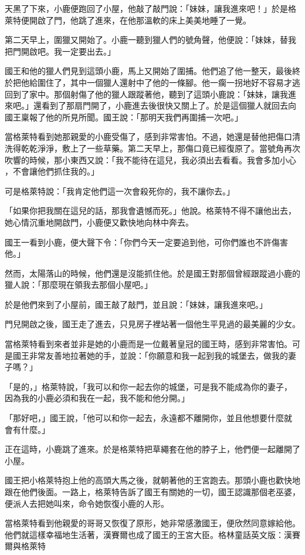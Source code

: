 \documentclass[oneside,10pt]{memoir} %
\begin{document}
天黑了下來，小鹿便跑回了小屋，他敲了敲門說：「妹妹，讓我進來吧！」於是格
萊特便開啟了門，他跳了進來，在他那溫軟的床上美美地睡了一覺。

第二天早上，圍獵又開始了。小鹿一聽到獵人們的號角聲，他便說：「妹妹，替我
把門開啟吧。我一定要出去。」

國王和他的獵人們見到這頭小鹿，馬上又開始了圍捕。他們追了他一整天，最後終
於把他給圍住了，其中一個獵人還射中了他的一條腳。他一瘸一拐地好不容易才逃
回到了家中。那個射傷了他的獵人跟蹤著他，聽到了這頭小鹿說：「妹妹，讓我進
來吧。」還看到了那扇門開了，小鹿進去後很快又關上了。於是這個獵人就回去向
國王稟報了他的所見所聞。國王說：「那明天我們再圍捕一次吧。」

當格萊特看到她那親愛的小鹿受傷了，感到非常害怕。不過，她還是替他把傷口清
洗得乾乾淨淨，敷上了一些草藥。第二天早上，那傷口竟已經復原了。當號角再次
吹響的時候，那小東西又說：「我不能待在這兒，我必須出去看看。我會多加小心
，不會讓他們抓住我的。」

可是格萊特說：「我肯定他們這一次會殺死你的，我不讓你去。」

「如果你把我關在這兒的話，那我會遺憾而死。」他說。格萊特不得不讓他出去，
她心情沉重地開啟門，小鹿便又歡快地向林中奔去。

國王一看到小鹿，便大聲下令：「你們今天一定要追到他，可你們誰也不許傷害他。」

然而，太陽落山的時候，他們還是沒能抓住他。於是國王對那個曾經跟蹤過小鹿的
獵人說：「那麼現在領我去那個小屋吧。」

於是他們來到了小屋前，國王敲了敲門，並且說：「妹妹，讓我進來吧。」

門兒開啟之後，國王走了進去，只見房子裡站著一個他生平見過的最美麗的少女。

當格萊特看到來者並非是她的小鹿而是一位戴著皇冠的國王時，感到非常害怕。可
是國王非常友善地拉著她的手，並說：「你願意和我一起到我的城堡去，做我的妻
子嗎？」

「是的，」格萊特說，「我可以和你一起去你的城堡，可是我不能成為你的妻子，
因為我的小鹿必須和我在一起，我不能和他分開。」

「那好吧，」國王說，「他可以和你一起去，永遠都不離開你，並且他想要什麼就
會有什麼。」

正在這時，小鹿跳了進來。於是格萊特把草繩套在他的脖子上，他們便一起離開了小屋。

國王把小格萊特抱上他的高頭大馬之後，就朝著他的王宮跑去。那頭小鹿也歡快地
跟在他們後面。一路上，格萊特告訴了國王有關她的一切，國王認識那個老巫婆，
便派人去把她叫來，命令她恢復小鹿的人形。

當格萊特看到他親愛的哥哥又恢復了原形，她非常感激國王，便欣然同意嫁給他。
他們就這樣幸福地生活著，漢賽爾也成了國王的王宮大臣。格林童話英文版：漢賽
爾與格萊特
\end{document}
